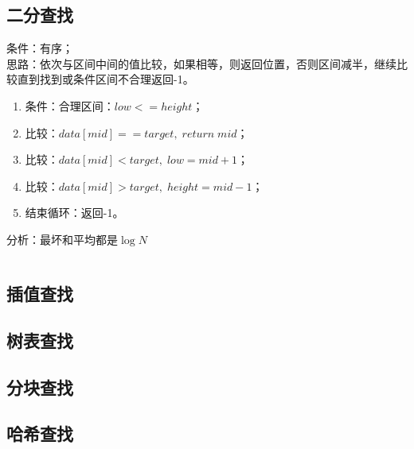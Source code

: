 \documentclass{article}
\begin{document}
    \subsection{二分查找}
      条件：有序；
      \\[10pt] 思路：依次与区间中间的值比较，如果相等，则返回位置，否则区间减半，继续比较直到找到或条件区间不合理返回-1。
      \begin{enumerate}
        \item 条件：合理区间：$low <= height$；
        \item 比较：$data[mid] ==  target, \; return \; mid$；
        \item 比较：$data[mid] < target, \; low = mid + 1$；
        \item 比较：$data[mid] > target, \; height = mid - 1$；
        \item 结束循环：返回-1。
      \end{enumerate}
      分析：最坏和平均都是$\log N$
      \inputminted{java}{src/chapter03/BinarySearch.java}
    \subsection{插值查找}
    \subsection{树表查找}
    \subsection{分块查找}
    \subsection{哈希查找}
\end{document}
